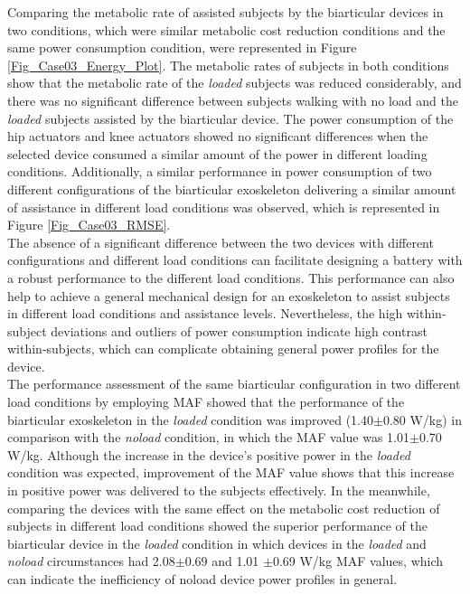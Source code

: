 \documentclass[10pt,letterpaper]{article}
\begin{document}
Comparing the metabolic rate of assisted subjects by the biarticular devices in two conditions, which were similar metabolic cost reduction conditions and the same power consumption condition, were represented in Figure \ref{Fig_Case03_Energy_Plot}. The metabolic rates of subjects in both conditions show that the metabolic rate of the {\it loaded} subjects was reduced considerably, and there was no significant difference between subjects walking with no load and the {\it loaded} subjects assisted by the biarticular device. The power consumption of the hip actuators and knee actuators showed no significant differences when the selected device consumed a similar amount of the power in different loading conditions. Additionally, a similar performance in power consumption of two different configurations of the biarticular exoskeleton delivering a similar amount of assistance in different load conditions was observed, which is represented in Figure \ref{Fig_Case03_RMSE}.\\
The absence of a significant difference between the two devices with different configurations and different load conditions can facilitate designing a battery with a robust performance to the different load conditions. This performance can also help to achieve a general mechanical design for an exoskeleton to assist subjects in different load conditions and assistance levels. Nevertheless, the high within-subject deviations and outliers of power consumption indicate high contrast within-subjects, which can complicate obtaining general power profiles for the device.\\
The performance assessment of the same biarticular configuration in two different load conditions by employing MAF showed that the performance of the biarticular exoskeleton in the {\it loaded} condition was improved (1.40$\pm$0.80 W/kg) in comparison with the  {\it noload} condition, in which the MAF value was 1.01$\pm$0.70 W/kg. Although the increase in the device's positive power in the {\it loaded} condition was expected, improvement of the MAF value shows that this increase in positive power was delivered to the subjects effectively. In the meanwhile, comparing the devices with the same effect on the metabolic cost reduction of subjects in different load conditions showed the superior performance of the biarticular device in the {\it loaded} condition in which devices in the {\it loaded} and {\it noload} circumstances had  2.08$\pm$0.69 and 1.01 $\pm$0.69 W/kg MAF values, which can indicate the inefficiency of noload device power profiles in general.\\
\end{document}
